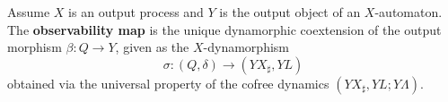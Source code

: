 Assume $X$ is an output process and $Y$ is the output object of an $X$-automaton. The \textbf{observability map} is the unique dynamorphic coextension of the output morphism $\beta: Q \to Y$, given as the $X$-dynamorphism
$$\sigma: (Q, \delta) \longrightarrow (YX_{\sharp}, YL)$$
obtained via the universal property of the cofree dynamics $(YX_{\sharp}, YL; Y\Lambda)$.
